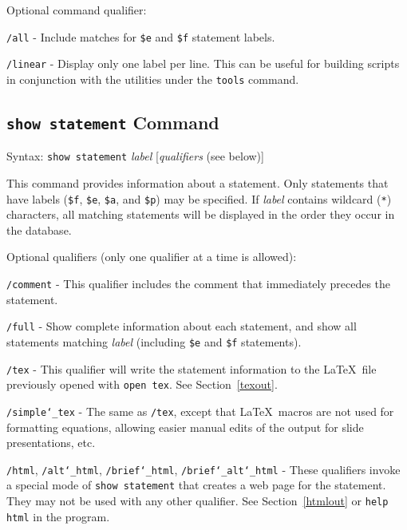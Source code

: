Optional command qualifier:

   \texttt{/all} - Include matches for \texttt{\$e} and \texttt{\$f}
   statement labels.

   \texttt{/linear} - Display only one label per line.  This can be useful for
       building scripts in conjunction with the utilities under the
       \texttt{tools} command.



\subsection{\texttt{show statement} Command}
Syntax:  \texttt{show statement} {\em label} [{\em qualifiers} (see below)]

This command provides information about a statement.  Only statements
that have labels (\texttt{\$f},
\texttt{\$e},
\texttt{\$a}, and
\texttt{\$p}) may be specified.
If {\em label}
contains wildcard (\verb$*$) characters, all matching statements will be
displayed in the order they occur in the database.

Optional qualifiers (only one qualifier at a time is allowed):

    \texttt{/comment} - This qualifier includes the comment that immediately
       precedes the statement.

    \texttt{/full} - Show complete information about each statement,
       and show all
       statements matching {\em label} (including \texttt{\$e}
       and \texttt{\$f} statements).

    \texttt{/tex} - This qualifier will write the statement information to the
       \LaTeX\ file previously opened with \texttt{open tex}.  See
       Section~\ref{texout}.

    \texttt{/simple{\char`\_}tex} - The same as \texttt{/tex}, except that
       \LaTeX\ macros are not used for formatting equations, allowing easier
       manual edits of the output for slide presentations, etc.

    \texttt{/html},
       \texttt{/alt{\char`\_}html}, \texttt{/brief{\char`\_}html},
       \texttt{/brief{\char`\_}alt{\char`\_}html} -
       These qualifiers invoke a special mode of
       \texttt{show statement} that
       creates a web page for the statement.  They may not be used with
       any other qualifier.  See Section~\ref{htmlout} or
       \texttt{help html} in the program.


